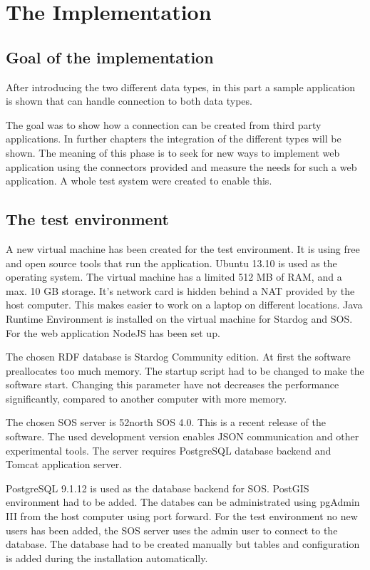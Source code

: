 \chapter{The Implementation}
\section{Goal of the implementation}

After introducing the two different data types, in this part a sample application is shown that can handle connection to both data types.

The goal was to show how a connection can be created from third party applications. In further chapters the integration of the different types will be shown. The meaning of this phase is to seek for new ways to implement web application using the connectors provided and measure the needs for such a web application. A whole test system were created to enable this.

\section{The test environment}

A new virtual machine has been created for the test environment. It is using free and open source tools that run the application.
Ubuntu 13.10 is used as the operating system. The virtual machine has a limited 512 MB of RAM, and a max. 10 GB storage. It's network card is hidden behind a NAT provided by the host computer. This makes easier to work on a laptop on different locations. Java Runtime Environment is installed on the virtual machine for Stardog and SOS. For the web application NodeJS has been set up.

The chosen RDF database is Stardog Community edition. At first the software preallocates too much memory. The startup script had to be changed to make the software start. Changing this parameter have not decreases the performance significantly, compared to another computer with more memory. 

The chosen SOS server is 52north SOS 4.0. This is a recent release of the software. The used development version enables JSON communication and other experimental tools. The server requires PostgreSQL database backend and Tomcat application server.

PostgreSQL 9.1.12 is used as the database backend for SOS. PostGIS environment had to be added. The databes can be administrated using pgAdmin III from the host computer using port forward. For the test environment no new users has been added, the SOS server uses the admin user to connect to the database. The database had to be created manually but tables and configuration is added during the installation automatically.

